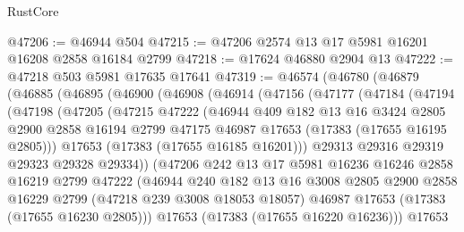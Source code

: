 \begin{lexlean}{RustCore}
\begin{coremodule}
@47206 := @46944 @504
@47215 := @47206 @2574 @13 @17 @5981 @16201 @16208 @2858 @16184 @2799
@47218 := @17624 @46880 @2904 @13
@47222 := @47218 @503 @5981 @17635 @17641
@47319 := @46574
    (@46780
      (@46879
        (@46885
          (@46895
            (@46900
              (@46908
                (@46914
                  (@47156
                    (@47177
                      (@47184
                        (@47194
                          (@47198
                            (@47205
                              (@47215
                                @47222
                                (@46944
                                  @409
                                  @182
                                  @13
                                  @16
                                  @3424
                                  @2805
                                  @2900
                                  @2858
                                  @16194
                                  @2799
                                  @47175
                                  @46987
                                  @17653
                                  (@17383 (@17655 @16195 @2805)))
                                @17653
                                (@17383 (@17655 @16185 @16201)))
                              @29313
                              @29316
                              @29319
                              @29323
                              @29328
                              @29334))
                          (@47206
                            @242
                            @13
                            @17
                            @5981
                            @16236
                            @16246
                            @2858
                            @16219
                            @2799
                            @47222
                            (@46944
                              @240
                              @182
                              @13
                              @16
                              @3008
                              @2805
                              @2900
                              @2858
                              @16229
                              @2799
                              (@47218 @239 @3008 @18053 @18057)
                              @46987
                              @17653
                              (@17383 (@17655 @16230 @2805)))
                            @17653
                            (@17383 (@17655 @16220 @16236)))
                          @17653

\end{coremodule}
\end{lexlean}
